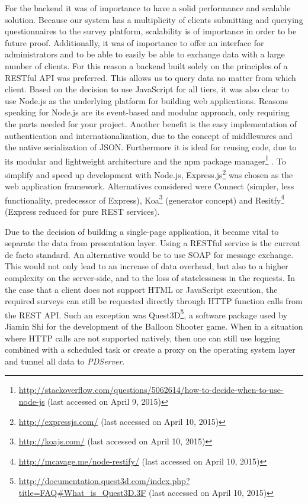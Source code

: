 		For the backend it was of importance to have a solid performance and scalable solution. Because our system has a multiplicity of clients submitting and querying questionnaires to the survey platform, scalability is of importance in order to be future proof. Additionally, it was of importance to offer an interface for administrators and to be able to easily be able to exchange data with a large number of clients. For this reason a backend built solely on the principles of a RESTful API was preferred. This allows us to query data no matter from which client.
		Based on the decision to use JavaScript for all tiers, it was also clear to use Node.js as the underlying platform for building web applications. Reasons speaking for Node.js are its event-based and modular approach, only requiring the parts needed for your project. Another benefit is the easy implementation of authentication and internationalization, due to the concept of middlewares \cite{Heise2014RESTConnect} and the native serialization of JSON. Furthermore it is ideal for reusing code, due to its modular and lightweight architecture and the npm package manager\footnote{\url{http://stackoverflow.com/questions/5062614/how-to-decide-when-to-use-node-js} (last accessed on April 9, 2015)} \cite{Heise2014NodeProCon}. To simplify and speed up development with Node.js, Express.js\footnote{\url{http://expressjs.com/} (last accessed on April 10, 2015)} was chosen as the web application framework. Alternatives considered were Connect (simpler, less functionality, predecessor of Express), Koa\footnote{\url{http://koajs.com/} (last accessed on April 10, 2015)} (generator concept) and Resitfy\footnote{\url{http://mcavage.me/node-restify/} (last accessed on April 10, 2015)} (Express reduced for pure REST services). 

		Due to the decision of building a single-page application, it became vital to separate the data from presentation layer. Using a RESTful service is the current de facto standard. An alternative would be to use SOAP for message exchange. This would not only lead to an increase of data overhead, but also to a higher complexity on the server-side, and to the loss of statelessness in the requests. In the case that a client does not support HTML or JavaScript execution, the required surveys can still be requested directly through HTTP function calls from the REST API. Such an exception was Quest3D\footnote{\url{http://documentation.quest3d.com/index.php?title=FAQ\#What_is_Quest3D.3F} (last accessed on April 10, 2015)}, a software package used by Jiamin Shi for the development of the Balloon Shooter game. When in a situation where HTTP calls are not supported natively, then one can still use logging combined with a scheduled task or create a proxy on the operating system layer and tunnel all data to \textit{PDServer}.





